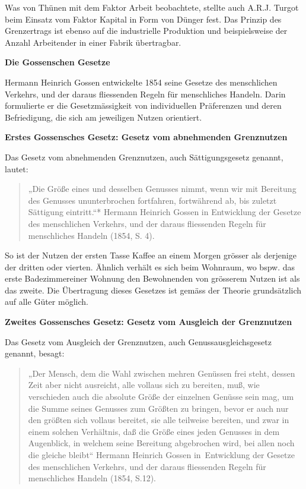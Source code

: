 \documentclass[
  nswissgerman,
  a4paper,
  DIV=11,
  numbers=noendperiod,
  oneside,
  openany]{scrreprt}
\begin{document}
\begin{tcolorbox}
Was von Thünen mit dem Faktor Arbeit beobachtete, stellte auch A.R.J.
Turgot beim Einsatz vom Faktor Kapital in Form von Dünger fest. Das
Prinzip des Grenzertrags ist ebenso auf die industrielle Produktion und
beispielsweise der Anzahl Arbeitender in einer Fabrik übertragbar.

\textbf{Die Gossenschen Gesetze}

Hermann Heinrich Gossen entwickelte 1854 seine Gesetze des menschlichen
Verkehrs, und der daraus fliessenden Regeln für menschliches Handeln.
Darin formulierte er die Gesetzmässigkeit von individuellen Präferenzen
und deren Befriedigung, die sich am jeweiligen Nutzen orientiert.

\textbf{Erstes Gossensches Gesetz: Gesetz vom abnehmenden Grenznutzen}

Das Gesetz vom abnehmenden Grenznutzen, auch Sättigungsgesetz genannt,
lautet:

\begin{quote}
„Die Größe eines und desselben Genusses nimmt, wenn wir mit Bereitung
des Genusses ununterbrochen fortfahren, fortwährend ab, bis zuletzt
Sättigung eintritt.``* Hermann Heinrich Gossen in Entwicklung der
Gesetze des menschlichen Verkehrs, und der daraus fliessenden Regeln für
menschliches Handeln (1854, S. 4).
\end{quote}

So ist der Nutzen der ersten Tasse Kaffee an einem Morgen grösser als
derjenige der dritten oder vierten. Ähnlich verhält es sich beim
Wohnraum, wo bspw. das erste Badezimmereiner Wohnung den Bewohnenden von
grösserem Nutzen ist als das zweite. Die Übertragung dieses Gesetzes ist
gemäss der Theorie grundsätzlich auf alle Güter möglich.

\textbf{Zweites Gossensches Gesetz: Gesetz vom Ausgleich der
Grenznutzen}

Das Gesetz vom Ausgleich der Grenznutzen, auch Genussausgleichsgesetz
genannt, besagt:

\begin{quote}
„Der Mensch, dem die Wahl zwischen mehren Genüssen frei steht, dessen
Zeit aber nicht ausreicht, alle vollaus sich zu bereiten, muß, wie
verschieden auch die absolute Größe der einzelnen Genüsse sein mag, um
die Summe seines Genusses zum Größten zu bringen, bevor er auch nur den
größten sich vollaus bereitet, sie alle teilweise bereiten, und zwar in
einem solchen Verhältnis, daß die Größe eines jeden Genusses in dem
Augenblick, in welchem seine Bereitung abgebrochen wird, bei allen noch
die gleiche bleibt`` Hermann Heinrich Gossen in~Entwicklung der Gesetze
des menschlichen Verkehrs, und der daraus fliessenden Regeln für
menschliches Handeln (1854, S.12).
\end{quote}


\end{tcolorbox}
\end{document}
